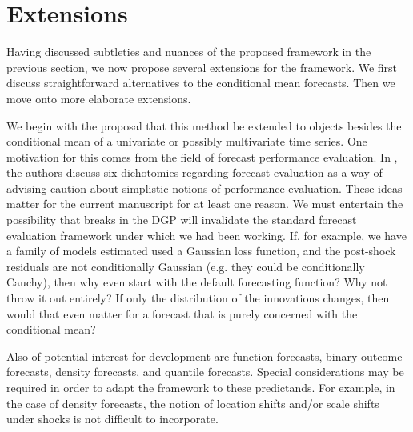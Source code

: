 \documentclass{uiucthesis2021}
\theoremstyle{definition}
\begin{document}
  
  
  \section{Extensions}\label{Extensions}

  Having discussed subtleties and nuances of the proposed framework in the previous section, we now propose several extensions for the framework.  We first discuss straightforward alternatives to the conditional mean forecasts.  Then we move onto more elaborate extensions.

  We begin with the proposal that this method be extended to objects besides the conditional mean of a univariate or possibly multivariate time series.  One motivation for this comes from the field of forecast performance evaluation.  In \cite[][]{clements2005evaluating}, the authors discuss six dichotomies regarding forecast evaluation as a way of advising caution about simplistic notions of performance evaluation.  These ideas matter for the current manuscript for at least one reason.  We must entertain the possibility that breaks in the DGP will invalidate the standard forecast evaluation framework under which we had been working.  If, for example, we have a family of models estimated used a Gaussian loss function, and the post-shock residuals are not conditionally Gaussian (e.g. they could be conditionally Cauchy), then why even start with the default forecasting function?  Why not throw it out entirely?  If only the distribution of the innovations changes, then would that even matter for a forecast that is purely concerned with the conditional mean?  
  
Also of potential interest for development are function forecasts, binary outcome forecasts, density forecasts, and quantile forecasts.  Special considerations may be required in order to adapt the framework to these predictands.  For example, in the case of density forecasts, the notion of location shifts and/or scale shifts under shocks is not difficult to incorporate.  
\end{document}
